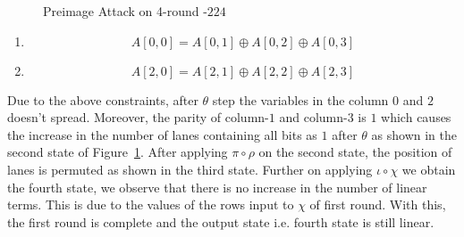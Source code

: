 \begin{figure}[H]
    \caption{Preimage Attack on 4-round \KECCAK-$224$}
    \label{fig:keccak224}
\end{figure}



\begin{enumerate}
    \item \[
        A[0,0] = A[0,1] \oplus A[0,2] \oplus A[0, 3]
    \]
\item \[
        A[2,0] = A[2,1] \oplus A[2,2] \oplus A[2,3]
    \]
\end{enumerate}

Due to the above constraints, after $\theta$ step the variables in the column $0$ and $2$ doesn't spread. Moreover, the parity of column-$1$ and column-$3$ is $1$ which causes the increase in the number of lanes containing all bits as $1$ after $\theta$ as shown in the second state of Figure~\ref{fig:keccak224}. After applying $\pi \circ \rho$ on the second state, the position of lanes is permuted as shown in the third state. Further on applying $\iota \circ \chi$ we obtain the fourth state, we observe that there is no increase in the number of linear terms. This is due to the values of the rows input to $\chi$ of first round. With this, the first round is complete and the output state i.e. fourth state is still linear.


